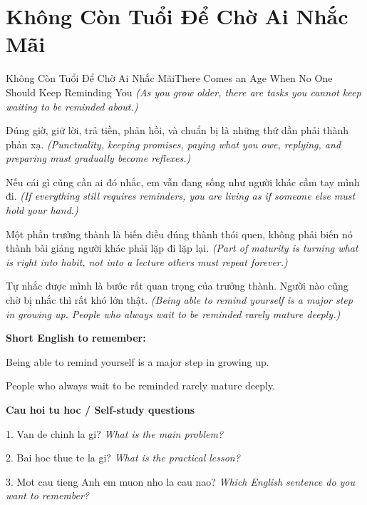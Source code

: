 \section{Không Còn Tuổi Để Chờ Ai Nhắc Mãi}
\begin{truyen}{Không Còn Tuổi Để Chờ Ai Nhắc Mãi}{There Comes an Age When No One Should Keep Reminding You}
\textit{(As you grow older, there are tasks you cannot keep waiting to be reminded about.)}

Đúng giờ, giữ lời, trả tiền, phản hồi, và chuẩn bị là những thứ dần phải thành phản xạ.
\textit{(Punctuality, keeping promises, paying what you owe, replying, and preparing must gradually become reflexes.)}

Nếu cái gì cũng cần ai đó nhắc, em vẫn đang sống như người khác cầm tay mình đi.
\textit{(If everything still requires reminders, you are living as if someone else must hold your hand.)}

Một phần trưởng thành là biến điều đúng thành thói quen, không phải biến nó thành bài giảng người khác phải lặp đi lặp lại.
\textit{(Part of maturity is turning what is right into habit, not into a lecture others must repeat forever.)}

\end{truyen}

\begin{baihoc}
Tự nhắc được mình là bước rất quan trọng của trưởng thành. Người nào cũng chờ bị nhắc thì rất khó lớn thật.
\textit{(Being able to remind yourself is a major step in growing up. People who always wait to be reminded rarely mature deeply.)}
\end{baihoc}

\begin{ghinhoanh}
\textbf{Short English to remember:}

Being able to remind yourself is a major step in growing up.

People who always wait to be reminded rarely mature deeply.

\end{ghinhoanh}

\begin{tuhocnhanh}
\textbf{Cau hoi tu hoc / Self-study questions}

1. Van de chinh la gi? \textit{What is the main problem?}

2. Bai hoc thuc te la gi? \textit{What is the practical lesson?}

3. Mot cau tieng Anh em muon nho la cau nao? \textit{Which English sentence do you want to remember?}
\end{tuhocnhanh}
\ngancach

